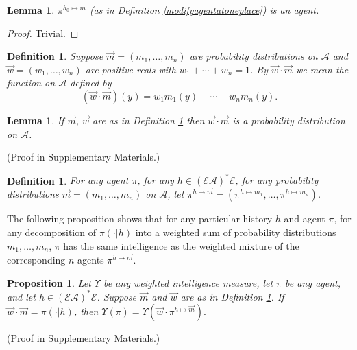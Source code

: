 \documentclass[twoside]{article}
\newtheorem{definition}[theorem]{Definition}
\newtheorem{lemma}[theorem]{Lemma}
\newtheorem{proposition}[theorem]{Proposition}
\begin{document}
\begin{lemma}
    $\pi^{h_0\mapsto m}$ (as in Definition \ref{modifyagentatoneplace})
    is an agent.
\end{lemma}

\begin{proof}
    Trivial.
\end{proof}

\begin{definition}
\label{sumofdistros}
    Suppose $\vec m=(m_1,\ldots,m_n)$ are probability distributions on $\mathcal A$
    and $\vec w=(w_1,\ldots,w_n)$ are positive reals with
    $w_1+\cdots+w_n=1$. By $\vec w\cdot\vec m$ we mean the function
    on $\mathcal A$ defined by
    \[
        (\vec w\cdot\vec m)(y) = w_1m_1(y) + \cdots + w_nm_n(y).
    \]
\end{definition}

\begin{lemma}
\label{wcdotmisaprobabilitydistro}
    If $\vec m$, $\vec w$ are as in Definition \ref{sumofdistros}
    then $\vec w\cdot\vec m$ is a probability distribution on $\mathcal A$.
\end{lemma}
\vspace{-0.5em}(Proof in Supplementary Materials.)


\begin{definition}
    For any agent $\pi$, for any $h\in(\mathcal E\mathcal A)^*\mathcal E$,
    for any probability distributions $\vec m=(m_1,\ldots,m_n)$ on $\mathcal A$,
    let $\pi^{h\mapsto \vec m}=(\pi^{h\mapsto m_1},\ldots,\pi^{h\mapsto m_n})$.
\end{definition}

The following proposition shows that
for any particular history $h$ and agent $\pi$,
for any decomposition of $\pi(\cdot|h)$ into a weighted sum
of probability distributions $m_1,\ldots,m_n$,
$\pi$ has the same intelligence as the weighted mixture of the corresponding $n$ agents
$\pi^{h\mapsto \vec m}$.

\begin{proposition}
\label{longproposition}
    Let $\Upsilon$ be any weighted intelligence measure, let $\pi$ be any agent,
    and let $h\in(\mathcal E\mathcal A)^*\mathcal E$.
    Suppose $\vec m$ and $\vec w$ are as in Definition \ref{sumofdistros}.
    If $\vec w\cdot\vec m = \pi(\cdot|h)$, then
    $
        \Upsilon(\pi)
        =
        \Upsilon(\vec w\cdot \pi^{h\mapsto \vec m}).
    $
\end{proposition}
\vspace{-0.5em}(Proof in Supplementary Materials.)
\end{document}
